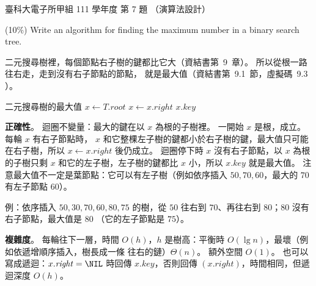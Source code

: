 \begin{pastexam}[label={px:ntust-111-et-ds-07}]{臺科大電子所甲組 111 學年度 第 7 題}
（演算法設計）

(10\%) Write an algorithm for finding the maximum number in a binary search tree.
\end{pastexam}

\begin{pastsoln}
二元搜尋樹裡，每個節點右子樹的鍵都比它大（資結書第~9~章）。 所以從根一路往右走，走到沒有右子節點的節點，
就是最大值（資結書第~9.1~節，虛擬碼~9.3 ）。

\begin{pseudo}{二元搜尋樹的最大值}
        \State {}
    \EndIf
    \State $x \gets T.\mathit{root}$
        \State $x \gets x.\mathit{right}$
    \EndWhile
    \State \Return $x.\mathit{key}$
\EndFunction
\end{pseudo}

\textbf{正確性}。 迴圈不變量：最大的鍵在以 $x$ 為根的子樹裡。 一開始 $x$ 是根，成立。 每輪 $x$ 有右子節點時，
$x$ 和它整棵左子樹的鍵都小於右子樹的鍵，最大值只可能在右子樹，所以 $x \gets x.\mathit{right}$ 後仍成立。 迴圈停下時
$x$ 沒有右子節點，以 $x$ 為根的子樹只剩 $x$ 和它的左子樹，左子樹的鍵都比 $x$ 小，所以 $x.\mathit{key}$ 就是最大值。
注意最大值不一定是葉節點：它可以有左子樹（例如依序插入 $50, 70, 60$，最大的 $70$ 有左子節點 $60$）。

例：依序插入 $50, 30, 70, 60, 80, 75$ 的樹，從 $50$ 往右到 $70$、再往右到 $80$；$80$ 沒有右子節點，最大值是 $80$
（它的左子節點是 $75$）。

\textbf{複雜度}。 每輪往下一層，時間 $O(h)$，$h$ 是樹高：平衡時 $O(\lg n)$，最壞（例如依遞增順序插入，樹長成一條
往右的鏈）$\Theta(n)$。 額外空間 $O(1)$。 也可以寫成遞迴：$x.\mathit{right} = \NIL$ 時回傳 $x.\mathit{key}$，否則回傳
$(x.\mathit{right})$，時間相同，但遞迴深度 $O(h)$。
\end{pastsoln}
